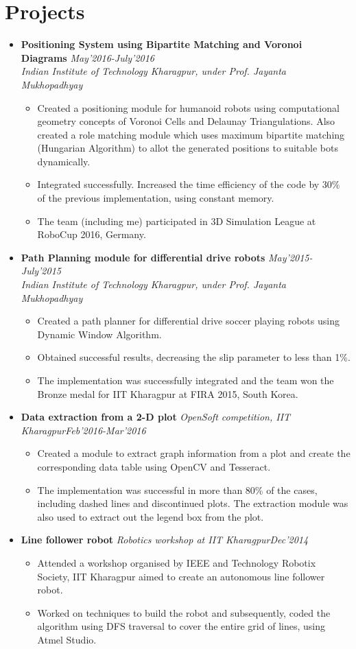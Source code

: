 \documentclass[11pt,a4paper]{moderncv}
\newcommand{\experience}[4]{
  \vspace{0.1cm}
\item \textbf{\large{#1}} \textit{#2}\hfill\textit{#3}
  \begin{itemize}[leftmargin=*]
    \setlength\itemsep{0em} #4
  \end{itemize}
}
\newcommand{\experiencetwo}[4]{
  \vspace{0.1cm}
\item \textbf{\large{#1}} \hfill\textit{#3}\\\textit{#2}
  \begin{itemize}[leftmargin=*]
    \setlength\itemsep{0em} #4
  \end{itemize}
}
\begin{document}
\section*{Projects}
\begin{itemize}
  \setlength\itemsep{0.5em}

  \experiencetwo{Positioning System using Bipartite Matching and Voronoi Diagrams}{Indian Institute of Technology Kharagpur, under Prof. Jayanta Mukhopadhyay}{May'2016-July'2016}{
   \item Created a positioning module for humanoid robots using computational geometry concepts of Voronoi Cells and Delaunay Triangulations. Also created a role matching module which uses maximum bipartite matching (Hungarian Algorithm) to allot the generated positions to suitable bots dynamically.  
  \item Integrated successfully. Increased the time efficiency of the code
    by 30\% of the previous implementation, using constant memory. 
  \item The team (including me) participated in 3D Simulation League at RoboCup 2016, Germany.
  }
  
  \experiencetwo{Path Planning module for differential drive robots}{Indian Institute of Technology Kharagpur, under Prof. Jayanta Mukhopadhyay}{May'2015-July'2015}{
  \item Created a path planner for differential drive soccer playing robots 
    using Dynamic Window Algorithm.
  \item Obtained successful results, decreasing the slip parameter to less
    than 1\%.  
  \item The implementation was successfully integrated and the team won the 
    Bronze medal for IIT Kharagpur at FIRA 2015, South Korea.
  }

  \experience{Data extraction from a 2-D plot}{OpenSoft competition, IIT Kharagpur}{Feb'2016-Mar'2016}{
  \item Created a module to extract graph information from a plot and create the corresponding data table using OpenCV and Tesseract.
  \item The implementation was successful in more than 80\% of the cases, including dashed lines and discontinued plots. The extraction module was also used to extract out the legend box from the plot.
  }

  \experience{Line follower robot}{Robotics workshop at IIT Kharagpur}{Dec'2014}{
  \item Attended a workshop organised by IEEE and Technology Robotix Society, IIT Kharagpur aimed to create an autonomous line follower robot.
  \item Worked on techniques to build the robot and subsequently, coded the algorithm using DFS traversal to cover the entire grid of lines, using Atmel Studio.
  }


\end{itemize}
\end{document}
